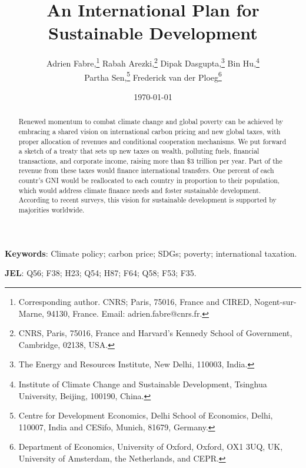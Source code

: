 \documentclass[12pt,english]{article}
\title{An International Plan for Sustainable Development
}
\author{Adrien Fabre,\footnote{Corresponding author. CNRS; Paris, 75016, France and CIRED, Nogent-sur-Marne, 94130, France. Email: adrien.fabre@cnrs.fr.} \;
Rabah Arezki,\footnote{CNRS, Paris, 75016, France and Harvard’s Kennedy School of Government, Cambridge, 02138, USA.} \;
Dipak Dasgupta,\footnote{The Energy and Resources Institute, New Delhi, 110003, India.} \;
Bin Hu,\footnote{Institute of Climate Change and Sustainable Development, Tsinghua University, Beijing, 100190, China.}  \\
Partha Sen,\footnote{Centre for Development Economics, Delhi School of Economics, Delhi, 110007, India and CESifo, Munich, 81679, Germany.}  \;
Frederick van der Ploeg\footnote{Department of Economics, University of Oxford, Oxford, OX1 3UQ, UK, University of Amsterdam, the Netherlands, and CEPR.} }
\date{\today{} %
}
\begin{document}
\maketitle

\begin{abstract}
  Renewed momentum to combat climate change and global poverty can be achieved by embracing a shared vision on international carbon pricing and new global taxes, with proper allocation of revenues and conditional cooperation mechanisms. We put forward a sketch of a treaty that sets up new taxes on wealth, polluting fuels, financial transactions, and corporate income, raising more than \$3 trillion per year. Part of the revenue from these taxes would finance international transfers. One percent of each countr's GNI would be reallocated to each country in proportion to their population, which would address climate finance needs and foster sustainable development. According to recent surveys, this vision for sustainable development is supported by majorities worldwide.
\end{abstract}

\textbf{Keywords}: Climate policy; carbon price; SDGs; poverty; international taxation.

\textbf{JEL}: Q56; F38; H23; Q54; H87; F64; Q58; F53; F35.
\end{document}
